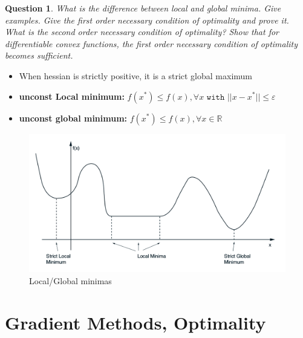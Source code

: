 \documentclass{article}
\newtheorem{question}{Question}
\begin{document}
\begin{question}
  What is the difference between local and global minima. Give examples.  Give the first order
  necessary condition of optimality and prove it. What is the second order necessary condition of
  optimality? Show that for differentiable convex functions, the first order necessary condition of
  optimality becomes sufficient.
\end{question}
\begin{itemize}
\item When hessian is strictly positive, it is a strict global maximum
\item \textbf{unconst Local minimum:}
  $f(x^*) \leq f(x), \forall x \texttt{ with } || x - x^* || \leq \varepsilon$
\item \textbf{unconst global minimum:} $f(x^*) \leq f(x), \forall x \in \mathbb{R}$
\end{itemize}

\begin{figure}[H]
  \includegraphics[width=\textwidth]{loc_glob_min.png}
  \caption{Local/Global minimas\label{fig:min}}
\end{figure}

\section{Gradient Methods, Optimality}
\end{document}
